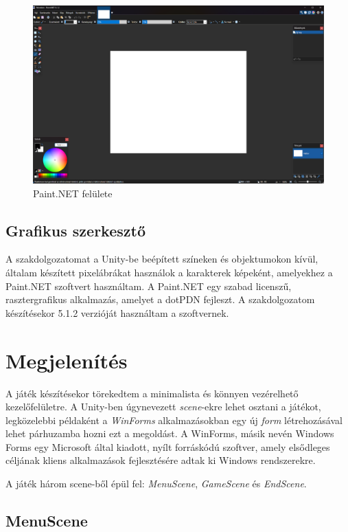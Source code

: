 \documentclass[
]{thesis-ekf}
\theoremstyle{definition}
\theoremstyle{remark}
\begin{document}
\begin{figure}[h!]
	\centering
	\includegraphics[width=15cm]{./pictures/paint_net.png}
	\caption{Paint.NET felülete}
	\label{PaintNET}
\end{figure}

\subsection{Grafikus szerkesztő}

A szakdolgozatomat a Unity-be beépített színeken és objektumokon kívül, általam készített pixelábrákat használok a karakterek képeként, amelyekhez a Paint.NET szoftvert használtam. A Paint.NET egy szabad licenszű, rasztergrafikus alkalmazás, amelyet a dotPDN fejleszt. A szakdolgozatom készítésekor 5.1.2 verzióját használtam a szoftvernek.

\section{Megjelenítés}

A játék készítésekor törekedtem a minimalista és könnyen vezérelhető kezelőfelületre. A Unity-ben úgynevezett \emph{scene}-ekre lehet osztani a játékot, legközelebbi példaként a \emph{WinForms} alkalmazásokban egy új \emph{form} létrehozásával lehet párhuzamba hozni ezt a megoldást. A WinForms, másik nevén Windows Forms egy Microsoft által kiadott, nyílt forráskódú szoftver, amely elsődleges céljának kliens alkalmazások fejlesztésére adtak ki Windows rendszerekre. \cite{winforms}

A játék három scene-ből épül fel: \emph{MenuScene}, \emph{GameScene} és \emph{EndScene}.

\subsection{MenuScene} \label{menusection}
\end{document}
